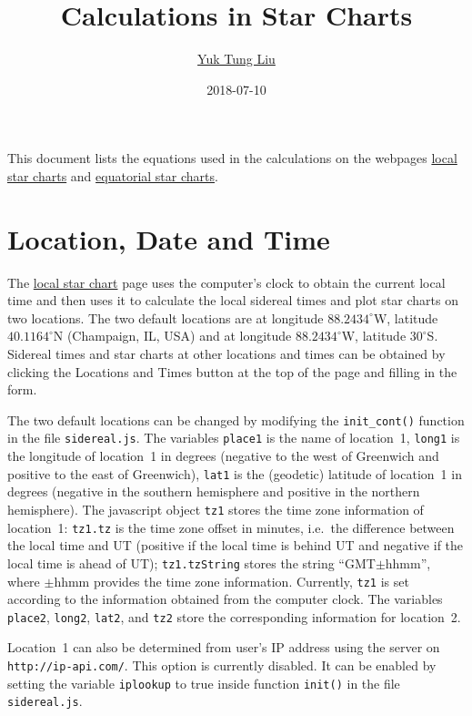 \documentclass[12pt]{article}
\begin{document}
\title{Calculations in Star Charts}
\author{\href{https://publish.illinois.edu/ytliu/}{Yuk Tung Liu}}
\date{2018-07-10}
\maketitle

This document lists the equations used in the calculations 
on the webpages \href{../sidereal.html}{local star charts} and 
\href{../chartGCRS.html}{equatorial star charts}. 

\section{Location, Date and Time}

The \href{../sidereal.html}{local star chart} page uses the computer's 
clock to obtain the current local time and then uses it to calculate 
the local sidereal times and plot star charts on two locations. 
The two default locations are at longitude $88.2434^\circ$W, 
latitude $40.1164^\circ$N (Champaign, IL, USA) and at longitude $88.2434^\circ$W, 
latitude $30^\circ$S. Sidereal times and star charts at other locations 
and times can be obtained by clicking the Locations and Times button 
at the top of the page and filling in the form. 

The two default locations can be changed by modifying the {\tt init\_cont()} 
function in the file {\tt sidereal.js}. The variables {\tt place1} 
is the name of location~1, {\tt long1} is the longitude of location~1 
in degrees (negative to the west of Greenwich and positive to the east 
of Greenwich), {\tt lat1} is the (geodetic) latitude of location~1 in 
degrees (negative in the southern hemisphere and positive in the northern 
hemisphere). The javascript object {\tt tz1} stores the time zone information 
of location~1: {\tt tz1.tz} is the time zone offset in minutes, i.e.\ the difference 
between the local time and UT (positive if the local time is behind UT and 
negative if the local time is ahead of UT); {\tt tz1.tzString} stores the 
string ``GMT$\pm$hhmm'', where $\pm$hhmm provides the time zone information. 
Currently, {\tt tz1} is set according to the information obtained from the computer clock. 
The variables {\tt place2}, {\tt long2}, {\tt lat2}, and {\tt tz2} 
store the corresponding information for location~2. 

Location~1 can also be determined from user's IP address using the server 
on {\tt http://ip-api.com/}. This option is currently disabled. It can be 
enabled by setting the variable {\tt iplookup} to true inside function {\tt init()} 
in the file {\tt sidereal.js}.
\end{document}
